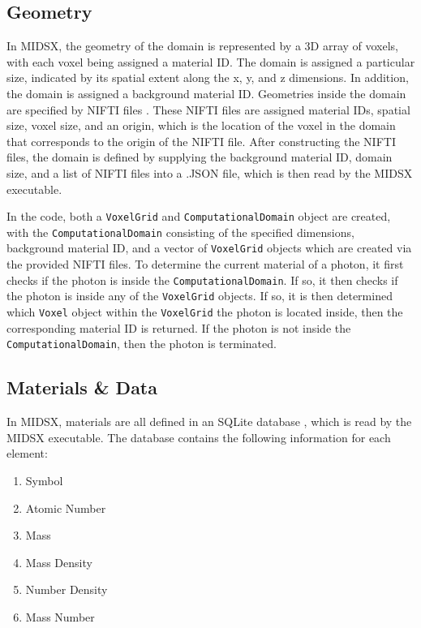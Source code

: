 \subsection{Geometry}
\par In MIDSX, the geometry of the domain is represented by a 3D array of voxels, with each voxel being assigned a material ID. The domain is assigned a particular size, indicated by its spatial extent along the x, y, and z dimensions. In addition, the domain is assigned a background material ID. Geometries inside the domain are specified by NIFTI files \cite{nifti2004}. These NIFTI files are assigned material IDs, spatial size, voxel size, and an origin, which is the location of the voxel in the domain that corresponds to the origin of the NIFTI file. After constructing the NIFTI files, the domain is defined by supplying the background material ID, domain size, and a list of NIFTI files into a .JSON file, which is then read by the MIDSX executable.
\par In the code, both a \texttt{VoxelGrid} and \texttt{ComputationalDomain} object are created, with the \texttt{ComputationalDomain} consisting of the specified dimensions, background material ID, and a vector of \texttt{VoxelGrid} objects which are created via the provided NIFTI files. To determine the current material of a photon, it first checks if the photon is inside the \texttt{ComputationalDomain}. If so, it then checks if the photon is inside any of the \texttt{VoxelGrid} objects. If so, it is then determined which \texttt{Voxel} object within the \texttt{VoxelGrid} the photon is located inside, then the corresponding material ID is returned. If the photon is not inside the \texttt{ComputationalDomain}, then the photon is terminated. \\

\subsection{Materials \& Data}
\par In MIDSX, materials are all defined in an SQLite database \cite{sqlite2020hipp}, which is read by the MIDSX executable. The database contains the following information for each element:

\begin{enumerate}
    \item Symbol
    \item Atomic Number
    \item Mass
    \item Mass Density
    \item Number Density
    \item Mass Number
\end{enumerate}

